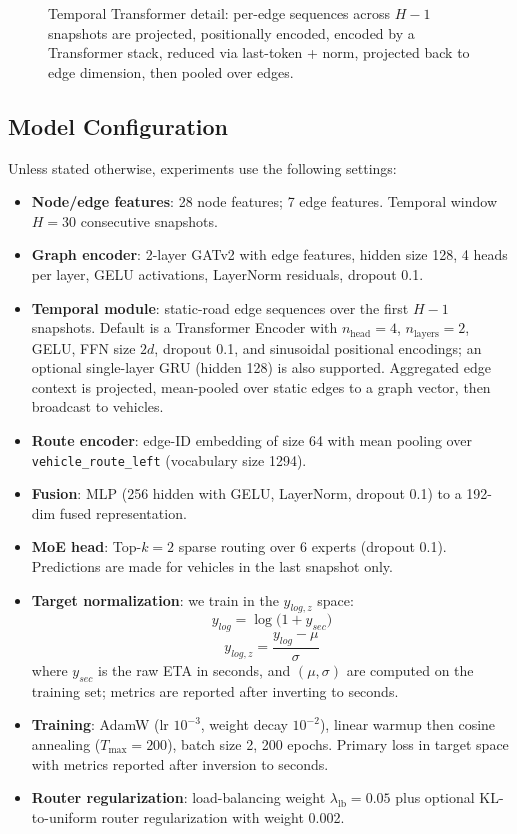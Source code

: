 \begin{figure}[t]
    \centering
    \resizebox{\linewidth}{!}{}
    \caption{Temporal Transformer detail: per-edge sequences across $H{-}1$ snapshots are projected, positionally encoded, encoded by a Transformer stack, reduced via last-token + norm, projected back to edge dimension, then pooled over edges.}
    \label{fig:transformer-detail}
\end{figure}

\subsection{Model Configuration}
Unless stated otherwise, experiments use the following settings:
\begin{itemize}
    \item \textbf{Node/edge features}: 28 node features; 7 edge features. Temporal window $H{=}30$ consecutive snapshots.
    \item \textbf{Graph encoder}: 2-layer GATv2 with edge features, hidden size 128, 4 heads per layer, GELU activations, LayerNorm residuals, dropout 0.1.
    \item \textbf{Temporal module}: static-road edge sequences over the first $H{-}1$ snapshots. Default is a Transformer Encoder with $n_\text{head}{=}4$, $n_\text{layers}{=}2$, GELU, FFN size $2d$, dropout 0.1, and sinusoidal positional encodings; an optional single-layer GRU (hidden 128) is also supported. Aggregated edge context is projected, mean-pooled over static edges to a graph vector, then broadcast to vehicles.
    \item \textbf{Route encoder}: edge-ID embedding of size 64 with mean pooling over \texttt{vehicle\_route\_left} (vocabulary size 1294).
    \item \textbf{Fusion}: MLP  (256 hidden with GELU, LayerNorm, dropout 0.1) to a 192-dim fused representation.
    \item \textbf{MoE head}: Top-$k{=}2$ sparse routing over $6$ experts (dropout 0.1). Predictions are made for vehicles in the last snapshot only.
    \item \textbf{Target normalization}: we train in the $y_{log,z}$ space:
    \begin{equation}
    y_{log} = \log\big(1 + y_{sec}\big)
    \end{equation}
    \begin{equation}
    y_{log,z} = \frac{y_{log} - \mu}{\sigma}
    \end{equation}
    where $y_{sec}$ is the raw ETA in seconds, and $(\mu,\sigma)$ are computed on the training set; metrics are reported after inverting to seconds.
    \item \textbf{Training}: AdamW (lr $10^{-3}$, weight decay $10^{-2}$), linear warmup then cosine annealing ($T_{\text{max}}{=}200$), batch size 2, 200 epochs. Primary loss in target space with metrics reported after inversion to seconds.
    \item \textbf{Router regularization}: load-balancing weight $\lambda_\text{lb}{=}0.05$ plus optional KL-to-uniform router regularization with weight 0.002.
\end{itemize}
